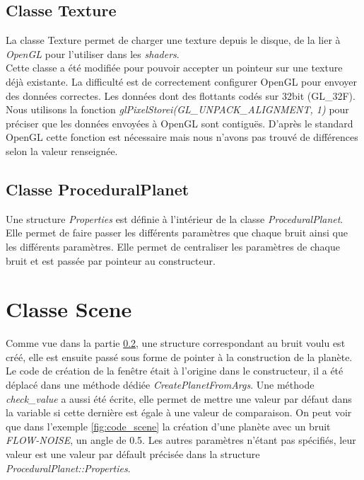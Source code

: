   \subsection{Classe Texture}
  \label{sec:class_texture}
  La classe Texture permet de charger une texture depuis le disque, de la lier à \textit{OpenGL} pour l'utiliser dans les \textit{shaders}.\\
  
  Cette classe a été modifiée pour pouvoir accepter un pointeur sur une texture déjà existante. 
  La difficulté est de correctement configurer OpenGL pour envoyer des données correctes. Les données dont des flottants codés sur 32bit (GL\_32F).\\
  Nous utilisons la fonction \textit{glPixelStorei(GL\_UNPACK\_ALIGNMENT, 1)} pour préciser que les données envoyées à OpenGL sont contiguës. D'après le standard OpenGL cette fonction est nécessaire mais 
  nous n'avons pas trouvé de différences selon la valeur renseignée.
  
  \subsection{Classe ProceduralPlanet}
    \label{sec::ProceduralPlanet}
  Une structure \textit{Properties} est définie à l'intérieur de la classe \textit{ProceduralPlanet}. Elle permet de faire passer les différents paramètres que chaque bruit ainsi que les différents paramètres. 
  Elle permet de centraliser les paramètres de chaque bruit et est passée par pointeur au constructeur.
  

  \section{Classe Scene}
  Comme vue dans la partie \ref{sec::ProceduralPlanet}, une structure correspondant au bruit voulu est créé,
  elle est ensuite passé sous forme de pointer à la construction de la planète.\\
  
  Le code de création de la fenêtre était à l'origine dans le constructeur, il a été déplacé dans une méthode dédiée \textit{CreatePlanetFromArgs}. Une méthode \textit{check_value} a aussi été écrite, elle permet de mettre une valeur par défaut dans la variable si cette dernière est égale à une valeur de comparaison. On peut voir que dans l'exemple \ref{fig:code_scene} la création d'une planète avec un bruit \textit{FLOW-NOISE}, un angle de 0.5. Les autres paramètres n'étant pas spécifiés, leur valeur est une valeur par défault précisée dans la structure \textit{ProceduralPlanet::Properties}.
  

